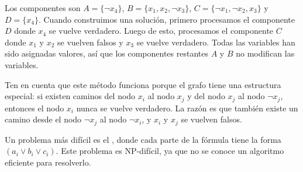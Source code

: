 Los componentes son
$A = \{\lnot x_4\}$,
$B = \{x_1, x_2, \lnot x_3\}$,
$C = \{\lnot x_1, \lnot x_2, x_3\}$ y
$D = \{x_4\}$. Cuando construimos una solución, primero procesamos el
componente $D$ donde $x_4$ se vuelve verdadero. Luego de esto,
procesamos el componente $C$ donde $x_1$ y $x_2$ se vuelven falsos y
$x_3$ se vuelve verdadero. Todas las variables han sido asignadas
valores, así que los componentes restantes $A$ y $B$ no modifican
las variables.

Ten en cuenta que este método funciona porque el grafo tiene una
estructura especial: si existen caminos del nodo $x_i$ al nodo $x_j$
y del nodo $x_j$ al nodo $\lnot x_j$, entonces el nodo $x_i$ nunca se
vuelve verdadero. La razón es que también existe un camino
desde el nodo $\lnot x_j$ al nodo $\lnot x_i$, y $x_i$ y $x_j$ se
vuelven falsos.

Un problema más difícil es el , donde cada parte
de la fórmula tiene la forma $(a_i \lor b_i \lor c_i)$. Este problema es
NP-difícil, ya que no se conoce un algoritmo eficiente para resolverlo.
